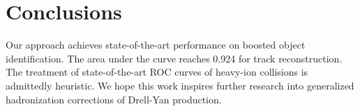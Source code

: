 \section{Conclusions}\label{sec:conclusions}

Our approach achieves state-of-the-art performance on boosted object
identification. The area under the curve reaches 0.924 for track
reconstruction. The treatment of state-of-the-art ROC curves of
heavy-ion collisions is admittedly heuristic. We hope this work inspires
further research into generalized hadronization corrections of Drell-Yan
production.

